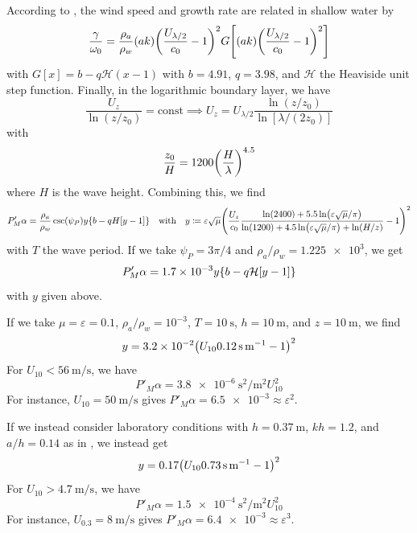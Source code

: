 \documentclass{jfm}
\renewcommand*{\epsilon}{\varepsilon}
\begin{document}
According to \citet{donelan2006wave}, the wind speed and growth rate
are related in shallow water by
\[
  \frac{\gamma}{\omega_0} = \frac{\rho_a}{\rho_w} (ak)
  \pqty{\frac{U_{\lambda/2}}{c_0} - 1}^2
  G \bqty{(ak)
  \pqty{\frac{U_{\lambda/2}}{c_0} - 1}^2}
\]
with $G[x] = b - q \mathcal{H}(x - 1)$ with $b = 4.91$, $q = 3.98$, and
$\mathcal{H}$ the Heaviside unit step function.
Finally, in the logarithmic boundary layer, we have
\[
  \frac{U_z}{\ln(z/z_0)} = \text{const}
  \implies U_{z} = U_{\lambda/2} \frac{\ln(z/z_0)}{\ln[\lambda/(2 z_0)]}
\]
with \citep{taylor2001dependence}
\[
  \frac{z_0}{H} = 1200 \pqty{\frac{H}{\lambda}}^{4.5}
\]
where $H$ is the wave height.
Combining this, we find
\[
  P'_M \alpha = \frac{\rho_a}{\rho_w} \csc(\psi_P)
  y \Bqty{b-qH[y - 1]} \qq{with}
  y \coloneqq
  \epsilon \sqrt{\mu}
  \pqty{\frac{U_{z}}{c_0} \frac{\ln(2400)+5.5\ln(\epsilon \sqrt{\mu}/\pi)}
    {\ln(1200) + 4.5 \ln(\epsilon \sqrt{\mu}/\pi) + \ln(H/z)} - 1}^2
\]
with $T$ the wave period.
If we take $\psi_P = 3\pi/4$ and $\rho_a/\rho_w = \num{1.225e3}$, we get
\[
  P'_M \alpha = \num{1.7e-3} y \Bqty{b-q \mathcal{H}[y - 1]}
\]
with $y$ given above.

If we take $\mu = \epsilon = 0.1$, $\rho_a/\rho_w = 10^{-3}$, $T =
\SI{10}{\second}$, $h = \SI{10}{\meter}$, and $z = \SI{10}{\meter}$, we
find
\[
  y = \num{3.2e-2} \pqty{U_{10} \SI{0.12}{\second\per\meter} - 1}^2
\]
For $U_{10} < \SI{56}{\meter\per\second}$, we have
\[
  P'_M \alpha = \SI{3.8e-6}{\second\squared\per\meter\squared} U_{10}^2
\]
For instance, $U_{10} = \SI{50}{\meter\per\second}$ gives
$P'_M \alpha = \num{6.5e-3} \approx \epsilon^2$.

If we instead consider laboratory conditions with $h=\SI{0.37}{\meter}$,
$kh = 1.2$, and $a/h = 0.14$ as in \citet{feddersen2005wind}, we
instead get
\[
  y = \num{0.17} \pqty{U_{10} \SI{0.73}{\second\per\meter} - 1}^2
\]
For $U_{10} > \SI{4.7}{\meter\per\second}$, we have
\[
  P'_M \alpha = \SI{1.5e-4}{\second\squared\per\meter\squared} U_{10}^2
\]
For instance, $U_{0.3} = \SI{8}{\meter\per\second}$ gives
$P'_M \alpha = \num{6.4e-3} \approx \epsilon^3$.
\end{document}

